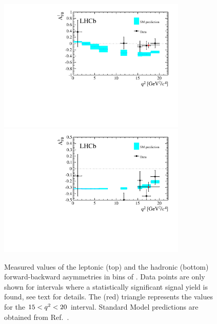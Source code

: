 \begin{figure}[ptb]
\centering
\includegraphics[width=0.8\textwidth]{Lmumu/figs/paper/figure8a.pdf}
\includegraphics[width=0.8\textwidth]{Lmumu/figs/paper/figure8b.pdf}
\caption{Measured values of the leptonic (top) and the hadronic (bottom)
  forward-backward asymmetries in bins of \qsq.
  Data points are only shown for \qsq intervals where a statistically
  significant signal yield is found, see text for details.
  The (red) triangle represents the values for the $15 < q^2 < 20$ \gevgevcccc
  interval. Standard Model predictions are obtained from Ref.~\cite{Meinel:2014wua}.}
\label{fig:Afb_results}
\end{figure}

